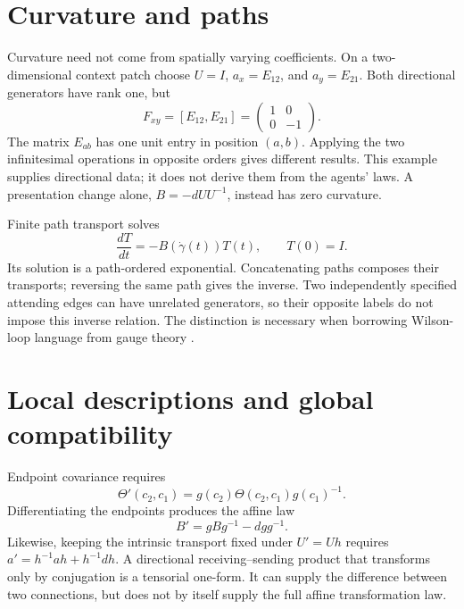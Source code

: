 \section{Curvature and paths}

Curvature need not come from spatially varying coefficients. On a two-dimensional context patch choose $U=I$, $a_x=E_{12}$, and $a_y=E_{21}$. Both directional generators have rank one, but
\begin{equation}
F_{xy}=[E_{12},E_{21}]
=\begin{pmatrix}1&0\\0&-1\end{pmatrix}.
\end{equation}
The matrix $E_{ab}$ has one unit entry in position $(a,b)$. Applying the two infinitesimal operations in opposite orders gives different results. This example supplies directional data; it does not derive them from the agents' laws. A presentation change alone, $B=-dUU^{-1}$, instead has zero curvature.

Finite path transport solves
\begin{equation}
\frac{dT}{dt}=-B(\dot\gamma(t))T(t),\qquad T(0)=I.
\end{equation}
Its solution is a path-ordered exponential. Concatenating paths composes their transports; reversing the same path gives the inverse. Two independently specified attending edges can have unrelated generators, so their opposite labels do not impose this inverse relation. The distinction is necessary when borrowing Wilson-loop language from gauge theory \citep{Wilson1974}.

\section{Local descriptions and global compatibility}

Endpoint covariance requires
\begin{equation}
\Theta'(c_2,c_1)=g(c_2)\Theta(c_2,c_1)g(c_1)^{-1}.
\end{equation}
Differentiating the endpoints produces the affine law
\begin{equation}
B'=gBg^{-1}-dg g^{-1}.
\end{equation}
Likewise, keeping the intrinsic transport fixed under $U'=Uh$ requires $a'=h^{-1}ah+h^{-1}dh$. A directional receiving--sending product that transforms only by conjugation is a tensorial one-form. It can supply the difference between two connections, but does not by itself supply the full affine transformation law.

